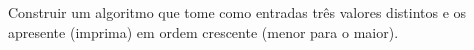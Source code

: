 
\question[10]

Construir um algoritmo que tome como entradas três valores distintos e os apresente (imprima) em ordem crescente (menor para o maior).

